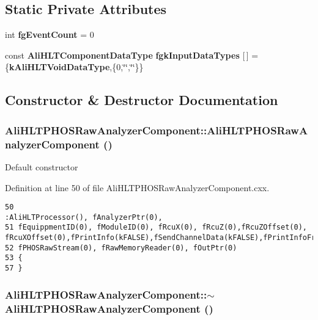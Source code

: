 \subsection*{Static Private Attributes}
\begin{CompactItemize}
\item 
int {\bf fg\-Event\-Count} = 0
\item 
const {\bf Ali\-HLTComponent\-Data\-Type} {\bf fgk\-Input\-Data\-Types} [$\,$] = \{{\bf k\-Ali\-HLTVoid\-Data\-Type},\{0,\char`\"{}\char`\"{},\char`\"{}\char`\"{}\}\}
\end{CompactItemize}


\subsection{Constructor \& Destructor Documentation}
\subsubsection{\setlength{\rightskip}{0pt plus 5cm}Ali\-HLTPHOSRaw\-Analyzer\-Component::Ali\-HLTPHOSRaw\-Analyzer\-Component ()}\label{classAliHLTPHOSRawAnalyzerComponent_a0}


Default constructor 

Definition at line 50 of file Ali\-HLTPHOSRaw\-Analyzer\-Component.cxx.

\footnotesize\begin{verbatim}50                                                               :AliHLTProcessor(), fAnalyzerPtr(0), 
51 fEquippmentID(0), fModuleID(0), fRcuX(0), fRcuZ(0),fRcuZOffset(0), fRcuXOffset(0),fPrintInfo(kFALSE),fSendChannelData(kFALSE),fPrintInfoFrequncy(1000), 
52 fPHOSRawStream(0), fRawMemoryReader(0), fOutPtr(0)
53 {
57 } 
\end{verbatim}\normalsize 


\subsubsection{\setlength{\rightskip}{0pt plus 5cm}Ali\-HLTPHOSRaw\-Analyzer\-Component::$\sim${\bf Ali\-HLTPHOSRaw\-Analyzer\-Component} ()\hspace{0.3cm}{\tt  [virtual]}}\label{classAliHLTPHOSRawAnalyzerComponent_a1}


